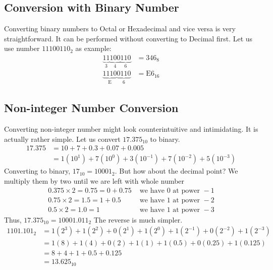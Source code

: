 \subsection{Conversion with Binary Number}
\noindent Converting binary numbers to Octal or Hexadecimal and vice versa is very straightforward. It can be performed without converting to Decimal first. Let us use number $11100110_2$ as example:
\begin{equation} \label{eq7}
\begin{split}
\underbrace{11}_\text{3}\underbrace{100}_\text{4}\underbrace{110}_\text{6} & = 346_8\\
\underbrace{1110}_\text{E}\underbrace{0110}_\text{6} & = \text{E}6_{16}
\end{split}
\end{equation}
\subsection{Non-integer Number Conversion}
Converting non-integer number might look counterintuitive and intimidating. It is actually rather simple. Let us convert $17.375_{10}$ to binary.
\[\begin{split}
17.375 & = 10 + 7 + 0.3+0.07+0.005 \\
& = 1(10^1) + 7(10^0) + 3(10^{-1}) + 7(10^{-2})+5(10^{-3})
\end{split}\]
Converting to binary, $17_{10} = 10001_2$. But how about the decimal point?
We multiply them by two until we are left with whole number
\begin{equation} \label{eq8}
\begin{split}
0.375 \times 2  = 0.75 = 0+0.75 & \text{ we have 0 at power }-1\\
0.75 \times 2  = 1.5 = 1+0.5 & \text{ we have 1 at power }-2\\
0.5 \times 2  = 1.0 = 1 & \text{ we have 1 at power }-3
\end{split}
\end{equation} 
Thus, $17.375_{10} = 10001.011_2$\newline
The reverse is much simpler.
\begin{equation} \label{eq2}
\begin{split}
1101.101_2 & = 1(2^3)+1(2^2)+0(2^1)+1(2^0)+1(2^{-1})+0(2^{-2})+1(2^{-3}) \\
& = 1(8)+1(4)+0(2)+1(1)+1(0.5)+0(0.25)+1(0.125) \\
& = 8 + 4 + 1+ 0.5+0.125 \\
& = 13.625_{10}
\end{split}
\end{equation} 
